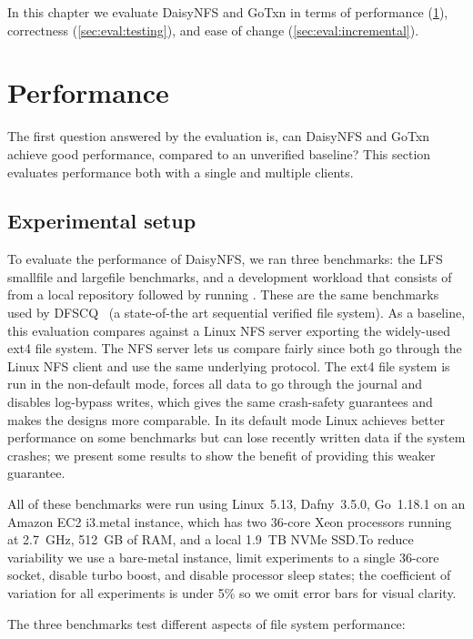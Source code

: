 In this chapter we evaluate DaisyNFS and GoTxn in terms of performance
(\cref{sec:eval:perf}), correctness (\cref{sec:eval:testing}),
and ease of change (\cref{sec:eval:incremental}).

\section{Performance}
\label{sec:eval:perf}

The first question answered by the evaluation is, can DaisyNFS and GoTxn achieve
good performance, compared to an unverified baseline? This section evaluates
performance both with a single and multiple clients.

\subsection{Experimental setup}

To evaluate the performance of DaisyNFS, we ran three benchmarks: the LFS smallfile
and largefile benchmarks, and a development workload that consists of  from a local repository followed by running . These are the same
benchmarks used by DFSCQ~\cite{chen:dfscq} (a state-of-the art sequential
verified file system). As a baseline, this evaluation compares against a Linux
NFS server exporting the widely-used ext4 file system.
The NFS server lets us compare fairly since both go through the Linux NFS client
and use the same underlying protocol. The ext4 file system is run in the
non-default  mode, forces all data to
go through the journal and disables log-bypass writes, which gives the same
crash-safety guarantees and makes the designs more comparable. In its default
 mode Linux achieves better performance on some benchmarks but
can lose recently written data if the system crashes; we present some results to
show the benefit of providing this weaker guarantee.

All of these benchmarks were run using Linux~5.13, Dafny~3.5.0, Go~1.18.1 on an Amazon
EC2 i3.metal instance, which has two 36-core Xeon processors running at 2.7~GHz, 512~GB of RAM, and a local 1.9~TB
NVMe SSD.\@ To reduce variability we use a bare-metal instance, limit experiments to a single 36-core
socket, disable turbo boost, and disable processor sleep states; the coefficient
of variation for all experiments is under 5\% so we omit error bars for visual
clarity.

The three benchmarks test different aspects of file system performance:

